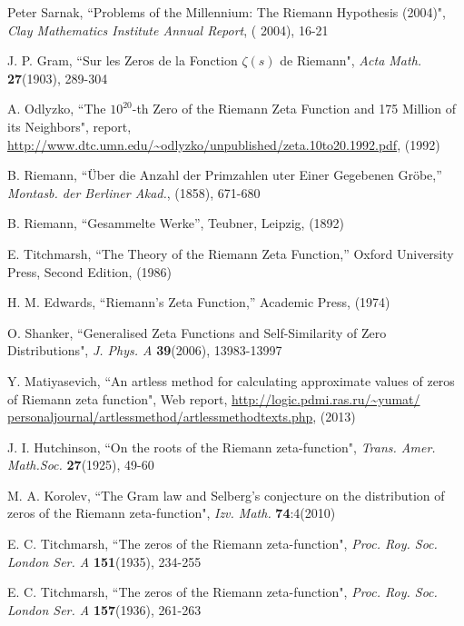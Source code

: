 \documentclass[twoside]{article}
\theoremstyle{definition}
\begin{document}
\begin{thebibliography} {}

 Peter Sarnak,
``Problems of the Millennium: The Riemann Hypothesis (2004)",  {\it Clay Mathematics Institute Annual Report}, ( 2004), 
16-21

 J. P. Gram, 
``Sur les Zeros de la Fonction  $\zeta ( s )$  de Riemann",
{\it Acta Math.} {\bf27}(1903), 289-304

  A. Odlyzko,
``The $10^{20}$-th Zero of the Riemann Zeta
Function and 175 Million of its Neighbors", report,
\url{http://www.dtc.umn.edu/~odlyzko/unpublished/zeta.10to20.1992.pdf}, (1992)


 B. Riemann, ``\"{U}ber die Anzahl der Primzahlen uter
Einer Gegebenen Gr\"{o}be,'' {\it Montasb. der Berliner Akad.}, (1858),
671-680

 B. Riemann, ``Gesammelte Werke'', Teubner, Leipzig, (1892)

 E. Titchmarsh, ``The Theory of the Riemann Zeta
Function,'' Oxford University Press, Second Edition, (1986)

 H. M. Edwards, ``Riemann's Zeta Function,''
Academic Press,  (1974)

 O. Shanker, 
``Generalised Zeta Functions and Self-Similarity of Zero Distributions",
{\it J.  Phys. A} {\bf39}(2006), 13983-13997

 Y. Matiyasevich, 
``An artless method for calculating approximate values of
zeros of Riemann zeta function",
Web report, \url{http://logic.pdmi.ras.ru/~yumat/
personaljournal/artlessmethod/artlessmethodtexts.php}, (2013)

 J. I. Hutchinson,
``On the roots of the Riemann zeta-function",
{\it Trans. Amer. Math.Soc.} {\bf27}(1925), 49-60

 M. A. Korolev,
``The Gram law and Selberg's conjecture on the distribution of zeros
of the Riemann zeta-function",
{\it Izv. Math.} {\bf74}:4(2010)

 E. C. Titchmarsh,
``The zeros of the Riemann zeta-function",
{\it Proc. Roy. Soc. London Ser. A} {\bf151}(1935), 234-255

 E. C. Titchmarsh,
``The zeros of the Riemann zeta-function",
{\it Proc. Roy. Soc. London Ser. A} {\bf157}(1936), 261-263


\end{thebibliography}
\end{document}
